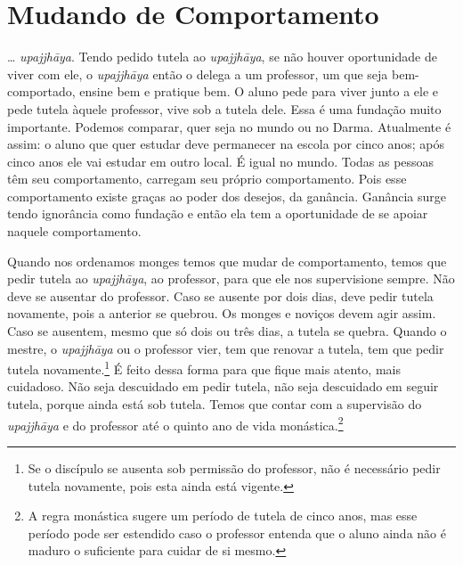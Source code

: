 
\chapter{Mudando de Comportamento}
\markright{\theChapterAuthor}

\ldots{} \textit{upajjhāya}. Tendo pedido tutela ao
\textit{upajjhāya}, se não houver oportunidade de viver com ele, o
\textit{upajjhāya} então o delega a um professor, um que seja
bem-comportado, ensine bem e pratique bem. O aluno pede para viver
junto a ele e pede tutela àquele professor, vive sob a tutela dele.
Essa é uma fundação muito importante. Podemos comparar, quer seja no
mundo ou no Darma. Atualmente é assim: o aluno que quer estudar deve
permanecer na escola por cinco anos; após cinco anos ele vai estudar em
outro local. É igual no mundo. Todas as pessoas têm seu comportamento,
carregam seu próprio comportamento. Pois esse comportamento existe
graças ao poder dos desejos, da ganância. Ganância surge tendo
ignorância como fundação e então ela tem a oportunidade de se apoiar
naquele comportamento. 

Quando nos ordenamos monges temos que mudar de comportamento, temos
que pedir tutela ao \textit{upajjhāya}, ao professor, para que ele
nos supervisione sempre. Não deve se ausentar do professor. Caso se
ausente por dois dias, deve pedir tutela novamente, pois a anterior se
quebrou. Os monges e noviços devem agir assim. Caso se ausentem, mesmo
que só dois ou três dias, a tutela se quebra. Quando o mestre, o
\textit{upajjhāya} ou o professor vier, tem que renovar a tutela, tem
que pedir tutela novamente.\footnote{Se o discípulo se ausenta sob
permissão do professor, não é necessário pedir tutela novamente, pois
esta ainda está vigente.} É feito dessa forma para que fique mais
atento, mais cuidadoso. Não seja descuidado em pedir tutela, não seja
descuidado em seguir tutela, porque ainda está sob tutela. Temos que
contar com a supervisão do \textit{upajjhāya} e do professor até o
quinto ano de vida monástica.\footnote{A regra monástica sugere um
período de tutela de cinco anos, mas esse período pode ser estendido
caso o professor entenda que o aluno ainda não é maduro o suficiente
para cuidar de si mesmo.} 

